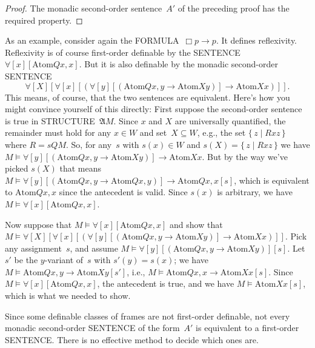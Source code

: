 \documentclass[10pt,a4paper]{article}
\newcommand*{\olup}[1]{\MakeUppercase{#1}}
\theoremstyle{plain}
\theoremstyle{definition}
\theoremstyle{remark}
\providecommand{\lif}{\mathbin{\rightarrow}}
\providecommand{\lforall}{\mathord{\forall}}
\providecommand{\Struct}{\ensuremath{\mathfrak{A}}}
\providecommand{\Assign}{\ensuremath{s}}
\providecommand{\Sat}[2]{\ensuremath{#1 \models #2}}
\providecommand{\Setabs}[2]{\{\, #1 \mid #2 \,\}}
\providecommand{\Atom}{\mathrm{Atom}}
\begin{document}
\begin{proof}
  The monadic second-order sentence~$A'$ of the preceding proof has
  the required property.
\end{proof}

As an example, consider again the \olup{formula}~$\Box p \lif p$. It
defines reflexivity. Reflexivity is of course first-order definable by
the \olup{sentence}~$\lforall[x][\Atom{Q}{x,x}]$. But it is also definable by the
monadic second-order \olup{sentence}
\[
\lforall[X][\lforall[x][(\lforall[y][(\Atom{Q}{x,y} \lif \Atom{X}{y})]
    \lif \Atom{X}{x})]].
\]
This means, of course, that the two sentences are equivalent. Here's
how you might convince yourself of this directly: First suppose the
second-order sentence is true in \olup{structure}~$\Struct{M}$. Since $x$ and $X$
are universally quantified, the remainder must hold for any $x \in W$
and set~$X \subseteq W$, e.g., the set $\Setabs{z}{Rxz}$ where $R =
\Assign{Q}{M}$. So, for any~$s$ with $s(x) \in W$ and $s(X) =
\Setabs{z}{Rxz}$ we have $\Sat{M}{\lforall[y][(\Atom{Q}{x,y} \lif
    \Atom{X}{y})] \lif \Atom{X}{x}}$. But by the way we've picked
$s(X)$ that means $\Sat{M}{\lforall[y][(\Atom{Q}{x,y} \lif
    \Atom{Q}{x,y})] \lif \Atom{Q}{x,x}}[s]$, which is equivalent to
$\Atom{Q}{x,x}$ since the antecedent is valid. Since $s(x)$ is
arbitrary, we have $\Sat{M}{\lforall[x][\Atom{Q}{x,x}]}$.

Now suppose that $\Sat{M}{\lforall[x][\Atom{Q}{x,x}]}$ and show that
$\Sat{M}{\lforall[X][\lforall[x][(\lforall[y][(\Atom{Q}{x,y} \lif
        \Atom{X}{y})] \lif \Atom{X}{x})]]}$. Pick any assignment~$s$,
and assume $\Sat{M}{\lforall[y][(\Atom{Q}{x,y} \lif
    \Atom{X}{y})]}[s]$. Let $s'$ be the $y$-variant of~$s$ with $s'(y)
= s(x)$; we have $\Sat{M}{\Atom{Q}{x,y} \lif \Atom{X}{y}}[s']$, i.e.,
$\Sat{M}{\Atom{Q}{x,x} \lif \Atom{X}{x}}[s]$. Since
$\Sat{M}{\lforall[x][\Atom{Q}{x,x}]}$, the antecedent is true, and we
have $\Sat{M}{\Atom{X}{x}}[s]$, which is what we needed to show.

Since some definable classes of frames are not first-order definable,
not every monadic second-order \olup{sentence} of the form~$A'$ is
equivalent to a first-order \olup{sentence}. There is no effective method
to decide which ones are.
\end{document}
